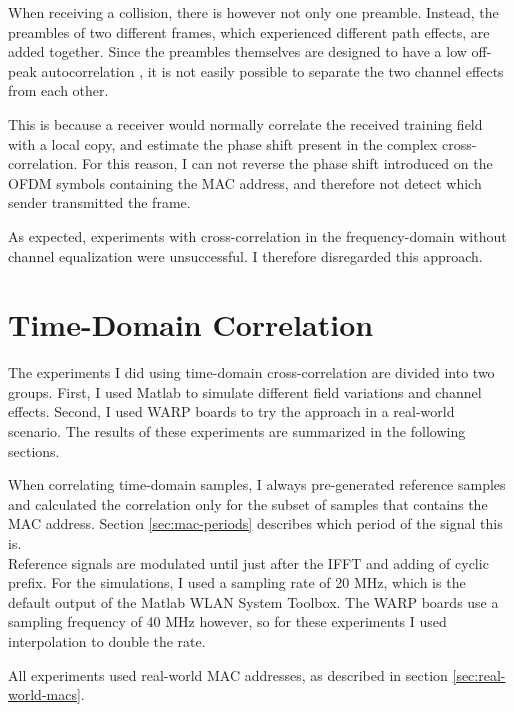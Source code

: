 When receiving a collision, there is however not only one preamble. Instead, the preambles of two different frames, which experienced different path effects, are added together. Since the preambles themselves are designed to have a low off-peak autocorrelation \cite{ieee2012}, it is not easily possible to separate the two channel effects from each other.

This is because a receiver would normally correlate the received training field with a local copy, and estimate the phase shift present in the complex cross-correlation. For this reason, I can not reverse the phase shift introduced on the \gls{OFDM} symbols containing the \gls{MAC} address, and therefore not detect which sender transmitted the frame.

As expected, experiments with cross-correlation in the frequency-domain without channel equalization were unsuccessful. I therefore disregarded this approach.



\section{Time-Domain Correlation}

The experiments I did using time-domain cross-correlation are divided into two groups. First, I used Matlab to simulate different field variations and channel effects. Second, I used WARP boards to try the approach in a real-world scenario. The results of these experiments are summarized in the following sections.

When correlating time-domain samples, I always pre-generated reference samples and calculated the correlation only for the subset of samples that contains the \gls{MAC} address. Section \ref{sec:mac-periods} describes which period of the signal this is.\\

Reference signals are modulated until just after the \gls{IFFT} and adding of cyclic prefix. For the simulations, I used a sampling rate of 20 MHz, which is the default output of the Matlab WLAN System Toolbox. The WARP boards use a sampling frequency of 40 MHz however, so for these experiments I used interpolation to double the rate.

All experiments used real-world \gls{MAC} addresses, as described in section \ref{sec:real-world-macs}.




